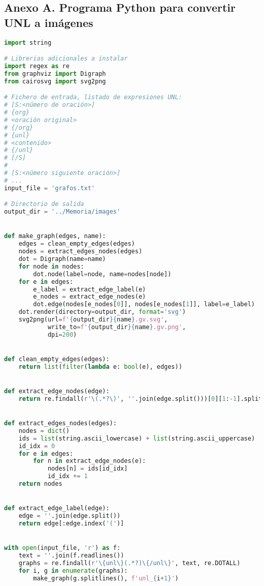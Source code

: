 \documentclass{article}
\begin{document}
\newpage
\subsection*{Anexo A. Programa Python para convertir UNL a imágenes}

\begin{lstlisting}[language=Python]
import string

# Librerias adicionales a instalar
import regex as re
from graphviz import Digraph
from cairosvg import svg2png

# Fichero de entrada, listado de expresiones UNL:
# [S:<número de oración>]
# {org}
# <oración original>
# {/org}
# {unl}
# <contenido>
# {/unl}
# [/S]
#
# [S:<número siguiente oración>]
# ...
input_file = 'grafos.txt'

# Directorio de salida
output_dir = '../Memoria/images'


def make_graph(edges, name):
    edges = clean_empty_edges(edges)
    nodes = extract_edges_nodes(edges)
    dot = Digraph(name=name)
    for node in nodes:
        dot.node(label=node, name=nodes[node])
    for e in edges:
        e_label = extract_edge_label(e)
        e_nodes = extract_edge_nodes(e)
        dot.edge(nodes[e_nodes[0]], nodes[e_nodes[1]], label=e_label)
    dot.render(directory=output_dir, format='svg')
    svg2png(url=f'{output_dir}{name}.gv.svg',
            write_to=f'{output_dir}{name}.gv.png',
            dpi=200)


def clean_empty_edges(edges):
    return list(filter(lambda e: bool(e), edges))


def extract_edge_nodes(edge):
    return re.findall(r'\(.*?\)', ''.join(edge.split()))[0][1:-1].split(',')


def extract_edges_nodes(edges):
    nodes = dict()
    ids = list(string.ascii_lowercase) + list(string.ascii_uppercase)
    id_idx = 0
    for e in edges:
        for n in extract_edge_nodes(e):
            nodes[n] = ids[id_idx]
            id_idx += 1
    return nodes


def extract_edge_label(edge):
    edge = ''.join(edge.split())
    return edge[:edge.index('(')]


with open(input_file, 'r') as f:
    text = ''.join(f.readlines())
    graphs = re.findall(r'\{unl\}(.*?)\{/unl\}', text, re.DOTALL)
    for i, g in enumerate(graphs):
        make_graph(g.splitlines(), f'unl_{i+1}')
\end{lstlisting}
\end{document}
